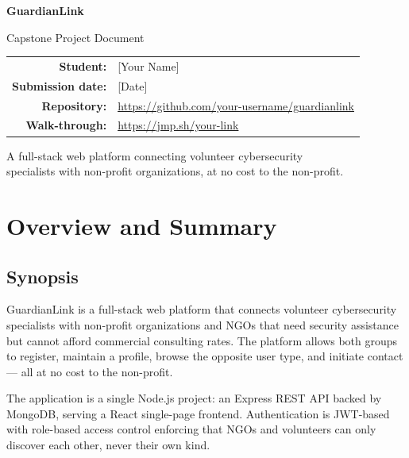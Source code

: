 \documentclass[11pt,letterpaper]{article}
\begin{document}
\begin{titlepage}
\centering
\vspace*{5cm}
{\Huge\bfseries\color{glnavy} GuardianLink\par}
\vspace{0.6cm}
{\LARGE Capstone Project Document\par}
\vspace{2.5cm}
{\large
\begin{tabular}{rl}
\textbf{Student:}        & [Your Name]\\[6pt]
\textbf{Submission date:}& [Date]\\[6pt]
\textbf{Repository:}     & \url{https://github.com/your-username/guardianlink}\\[6pt]
\textbf{Walk-through:}   & \url{https://jmp.sh/your-link}\\
\end{tabular}\par}
\vfill
{\small A full-stack web platform connecting volunteer cybersecurity\\
specialists with non-profit organizations, at no cost to the non-profit.\par}
\vspace{1cm}
\end{titlepage}

\tableofcontents
\newpage

\section{Overview and Summary}

\subsection{Synopsis}

GuardianLink is a full-stack web platform that connects volunteer
cybersecurity specialists with non-profit organizations and NGOs that need
security assistance but cannot afford commercial consulting rates. The
platform allows both groups to register, maintain a profile, browse the
opposite user type, and initiate contact --- all at no cost to the
non-profit.

The application is a single Node.js project: an Express REST API backed by
MongoDB, serving a React single-page frontend. Authentication is JWT-based
with role-based access control enforcing that NGOs and volunteers can only
discover each other, never their own kind.
\end{document}
